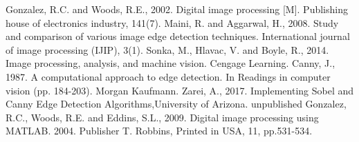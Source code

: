 ﻿\documentclass[conference]{IEEEtran}
\begin{document}
\begin{thebibliography}{00}
 Gonzalez, R.C. and Woods, R.E., 2002. Digital image processing [M]. Publishing house of electronics industry, 141(7).
 Maini, R. and Aggarwal, H., 2008. Study and comparison of various image edge detection techniques. International journal of image processing (IJIP), 3(1).
 Sonka, M., Hlavac, V. and Boyle, R., 2014. Image processing, analysis, and machine vision. Cengage Learning.
 Canny, J., 1987. A computational approach to edge detection. In Readings in computer vision (pp. 184-203). Morgan Kaufmann.
 Zarei, A., 2017. Implementing Sobel and Canny Edge Detection Algorithms,University of Arizona. unpublished
 Gonzalez, R.C., Woods, R.E. and Eddins, S.L., 2009. Digital image processing using MATLAB. 2004. Publisher T. Robbins, Printed in USA, 11, pp.531-534.
\end{thebibliography}
\end{document}
